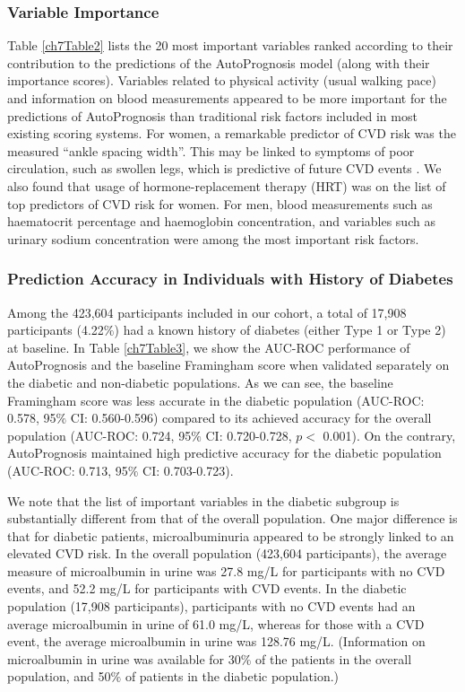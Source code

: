 \documentclass [PhD] {uclathes}
\begin{document}
\subsubsection*{Variable Importance} 
Table \ref{ch7Table2} lists the 20 most important variables ranked according to their contribution to the predictions of the AutoPrognosis model (along with their importance scores). Variables related to physical activity (usual walking pace) and information on blood measurements appeared to be more important for the predictions of AutoPrognosis than traditional risk factors included in most existing scoring systems. For women, a remarkable predictor of CVD risk was the measured ``ankle spacing width''. This may be linked to symptoms of poor circulation, such as swollen legs, which is predictive of future CVD events \cite{allison2008high}. We also found that usage of hormone-replacement therapy (HRT) was on the list of top predictors of CVD risk for women. For men, blood measurements such as haematocrit percentage and haemoglobin concentration, and variables such as urinary sodium concentration were among the most important risk factors.

\subsubsection*{Prediction Accuracy in Individuals with History of Diabetes} 
Among the 423,604 participants included in our cohort, a total of 17,908 participants (4.22$\%$) had a known history of diabetes (either Type 1 or Type 2) at baseline. In Table \ref{ch7Table3}, we show the AUC-ROC performance of AutoPrognosis and the baseline Framingham score when validated separately on the diabetic and non-diabetic populations. As we can see, the baseline Framingham score was less accurate in the diabetic population (AUC-ROC: 0.578, 95$\%$ CI: 0.560-0.596) compared to its achieved accuracy for the overall population (AUC-ROC: 0.724, 95$\%$ CI: 0.720-0.728, $p <$ 0.001). On the contrary, AutoPrognosis maintained high predictive accuracy for the diabetic population (AUC-ROC: 0.713, 95$\%$ CI: 0.703-0.723).

We note that the list of important variables in the diabetic subgroup is substantially different from that of the overall population. One major difference is that for diabetic patients, microalbuminuria appeared to be strongly linked to an elevated CVD risk. In the overall population (423,604 participants), the average measure of microalbumin in urine was 27.8 mg/L for participants with no CVD events, and 52.2 mg/L for participants with CVD events. In the diabetic population (17,908 participants), participants with no CVD events had an average microalbumin in urine of 61.0 mg/L, whereas for those with a CVD event, the average microalbumin in urine was 128.76 mg/L. (Information on microalbumin in urine was available for 30$\%$ of the patients in the overall population, and 50$\%$ of patients in the diabetic population.) 
\end{document}
